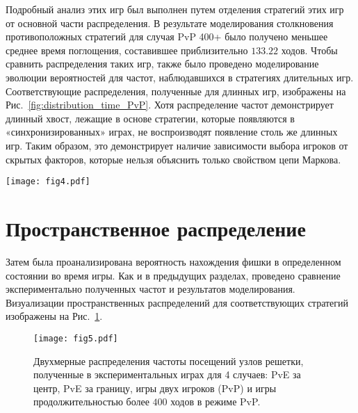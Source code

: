 Подробный анализ этих игр был выполнен путем отделения стратегий этих игр от основной части распределения. 
В результате моделирования столкновения противоположных стратегий для случая PvP 400+ было получено меньшее среднее время поглощения, составившее приблизительно $133.22$ ходов. 
Чтобы сравнить распределения таких игр, также было проведено моделирование эволюции вероятностей для частот, наблюдавшихся в стратегиях длительных игр. 
Соответствующие распределения, полученные для длинных игр, изображены на Рис.~\cref{fig:distribution_time_PvP}. Хотя распределение частот демонстрирует длинный хвост, 
лежащие в основе стратегии, которые появляются в «синхронизированных» играх, не воспроизводят появление столь же длинных игр. 
Таким образом, это демонстрирует наличие зависимости выбора игроков от скрытых факторов, которые нельзя объяснить только свойством цепи Маркова.


\begin{figure*}[t]
    \begin{center}
    \texttt{[image: fig4.pdf]}
    \caption{
        Распределение времени поглощения для режима PvP (желтая гистограмма и фиолетовая линия) 
        по сравнению с моделированием частот направлений движения (зеленая линия) и частот стратегий (синяя линия), 
        наблюдаемых в длительных играх (более $400$ ходов). Частоты направлений движения для каждого состояния, полученные в 
        экспериментальных длинных играх, использовались для моделирования эволюции вероятностей найти фишку в узлах решетки. 
        Стратегии обоих игроков A и B в PvP с длиной ходов более $400$ использовались отдельно при моделировании.
    }  
    \label{fig:distribution_time_PvP}
    \end{center}
\end{figure*}


\section{Пространственное распределение}\label{sec:ch3/sec4}

Затем была проанализирована вероятность нахождения фишки в определенном состоянии во время игры. 
Как и в предыдущих разделах, проведено сравнение экспериментально полученных частот и результатов моделирования. 
Визуализации пространственных распределений для соответствующих стратегий изображены на Рис.~\cref{fig:distribution_states}.

\begin{figure}[t]
    \begin{center}
    \texttt{[image: fig5.pdf]}
    \caption{
        Двухмерные распределения частоты посещений узлов решетки, полученные в экспериментальных играх для 4 случаев: 
        PvE за центр, PvE за границу, игры двух игроков (PvP) и игры продолжительностью более $400$ ходов в режиме PvP.
    }  
    \label{fig:distribution_states}
    \end{center}
\end{figure}

